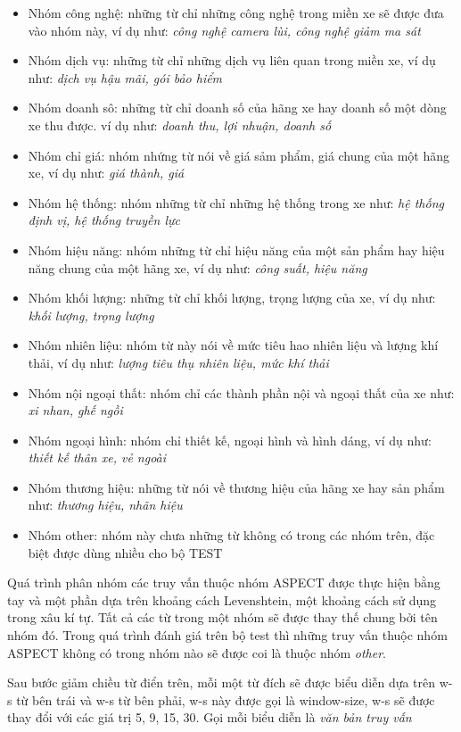 \documentclass[fontsize=12pt]{scrartcl}
\begin{document}
\begin{itemize}
\item Nhóm công nghệ: những từ chỉ những công nghệ trong miền xe sẽ được đưa vào nhóm này, ví dụ như: \textit{công nghệ camera lùi, công nghệ giảm ma sát}
\item Nhóm dịch vụ: những từ chỉ những dịch vụ liên quan trong miền xe, ví dụ như: \textit{dịch vụ hậu mãi, gói bảo hiểm}
\item Nhóm doanh sô: những từ chỉ doanh số của hãng xe hay doanh số một dòng xe thu được. ví dụ như: \textit{doanh thu, lợi nhuận, doanh số}
\item Nhóm chỉ giá: nhóm nhứng từ nói về giá sảm phẩm, giá chung của một hãng xe, ví dụ như: \textit{giá thành, giá}
\item Nhóm hệ thống: nhóm những từ chỉ những hệ thống trong xe như: \textit{hệ thống định vị, hệ thống truyền lực}
\item Nhóm hiệu năng: nhóm những từ chỉ hiệu năng của một sản phẩm hay hiệu năng chung của một hãng xe, ví dụ như: \textit{công suất, hiệu năng}
\item Nhóm khối lượng: những từ chỉ khối lượng, trọng lượng của xe, ví dụ như: \textit{khối lượng, trọng lượng}
\item Nhóm nhiên liệu: nhóm từ này nói về mức tiêu hao nhiên liệu và lượng khí thải, ví dụ như: \textit{lượng tiêu thụ nhiên liệu, mức khí thải}
\item Nhóm nội ngoại thất: nhóm chỉ các thành phần nội và ngoại thất của xe như: \textit{xi nhan, ghế ngồi}
\item Nhóm ngoại hình: nhóm chỉ thiết kế, ngoại hình và hình dáng, ví dụ như: \textit{thiết kế thân xe, vẻ ngoài}
\item Nhóm thương hiệu: những từ nói về thương hiệu của hãng xe hay sản phẩm như: \textit{thương hiệu, nhãn hiệu}
\item Nhóm other: nhóm này chưa những từ không có trong các nhóm trên, đặc biệt được dùng nhiều cho bộ TEST
\end{itemize}
\par
Quá trình phân nhóm các truy vấn thuộc nhóm ASPECT được thực hiện bằng tay và một phần dựa trên khoảng cách Levenshtein, một khoảng cách sử dụng trong xâu kí tự. Tất cả các từ trong một nhóm sẽ được thay thế chung bởi tên nhóm đó. Trong quá trình đánh giá trên bộ test thì những truy vấn thuộc nhóm ASPECT không có trong nhóm nào sẽ được coi là thuộc nhóm \textit{other}.
\par
Sau bước giảm chiều từ điển trên, mỗi một từ đích sẽ được biểu diễn dựa trên w-s từ bên trái và w-s từ bên phải, w-s này được gọi là window-size, w-s sẽ được thay đổi với các giá trị 5, 9, 15, 30. Gọi mỗi biểu diễn là \textit{văn bản truy vấn}
\end{document}
